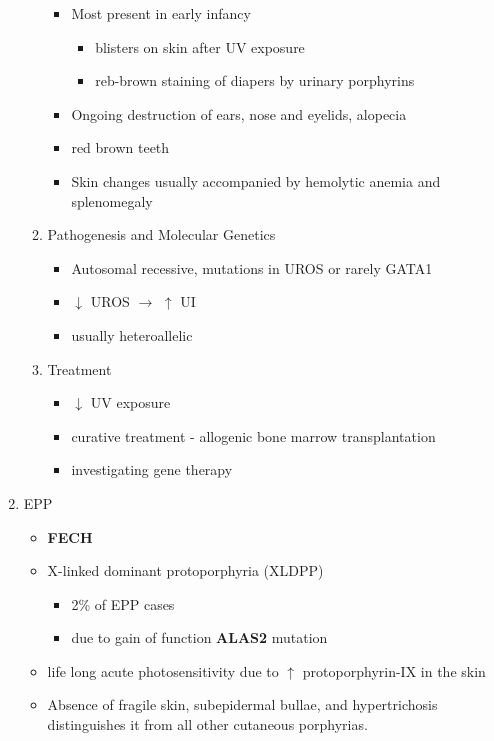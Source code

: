 \documentclass{scrartcl}
\begin{document}
\begin{enumerate}
\begin{enumerate}
\begin{itemize}
\item Most present in early infancy
\begin{itemize}
\item blisters on skin after UV exposure
\item reb-brown staining of diapers by urinary porphyrins
\end{itemize}
\item Ongoing destruction of ears, nose and eyelids, alopecia
\item red brown teeth
\item Skin changes usually accompanied by hemolytic anemia and splenomegaly
\end{itemize}
\item Pathogenesis and Molecular Genetics
\label{sec:org5ce5b05}
\begin{itemize}
\item Autosomal recessive, mutations in UROS or rarely GATA1
\item \(\downarrow\) UROS \(\to\) \(\uparrow\) UI
\item usually heteroallelic
\end{itemize}
\item Treatment
\label{sec:orgef186c7}
\begin{itemize}
\item \(\downarrow\) UV exposure
\item curative treatment - allogenic bone marrow transplantation
\item investigating gene therapy
\end{itemize}
\end{enumerate}

\item EPP
\label{sec:org285376a}
\begin{itemize}
\item \textbf{FECH}
\item X-linked dominant protoporphyria (XLDPP)
\begin{itemize}
\item 2\% of EPP cases
\item due to gain of function \textbf{ALAS2} mutation
\end{itemize}
\item life long acute photosensitivity due to \(\uparrow\) protoporphyrin-IX
in the skin
\item Absence of fragile skin, subepidermal bullae, and hypertrichosis
distinguishes it from all other cutaneous porphyrias.
\end{itemize}


\end{enumerate}
\end{document}

